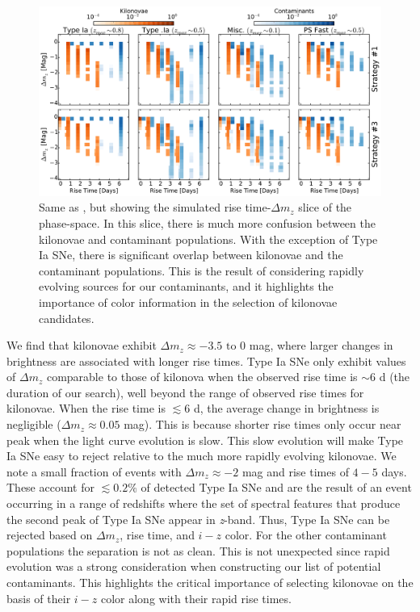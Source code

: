 \begin{figure}[t!]
\centering
\includegraphics[width=\textwidth]{./figs/chapter2/f9.pdf}
\caption{\singlespace Same as , but showing the simulated rise time-$\Delta m_z$ slice of the phase-space. In this slice, there is much more confusion between the kilonovae and contaminant populations. With the exception of Type Ia SNe, there is significant overlap between kilonovae and the contaminant populations. This is the result of considering rapidly evolving sources for our contaminants, and it highlights the importance of color information in the selection of kilonovae candidates.}
\label{fig:ch2_mcphasedm}
\end{figure}

We find that kilonovae exhibit $\Delta m_z \approx -3.5\text{ to }0$ mag, where larger changes in brightness are associated with longer rise times. Type Ia SNe only exhibit values of $\Delta m_z$ comparable to those of kilonova when the observed rise time is $\sim6$ d (the duration of our search), well beyond the range of observed rise times for kilonovae. When the rise time is $\lesssim6$ d, the average change in brightness is negligible ($\Delta m_z \approx 0.05$ mag). This is because shorter rise times only occur near peak when the light curve evolution is slow. This slow evolution will make Type Ia SNe easy to reject relative to the much more rapidly evolving kilonovae. We note a small fraction of events with $\Delta m_z \approx -2$ mag and rise times of $4-5$ days. These account for $\lesssim0.2\%$ of detected Type Ia SNe and are the result of an event occurring in a range of redshifts where the set of spectral features that produce the second peak of Type Ia SNe appear in {\em z}-band. Thus, Type Ia SNe can be rejected based on $\Delta m_z$, rise time, and $i-z$ color. For the other contaminant populations the separation is not as clean. This is not unexpected since rapid evolution was a strong consideration when constructing our list of potential contaminants. This highlights the critical importance of selecting kilonovae on the basis of their $i-z$ color along with their rapid rise times. 

